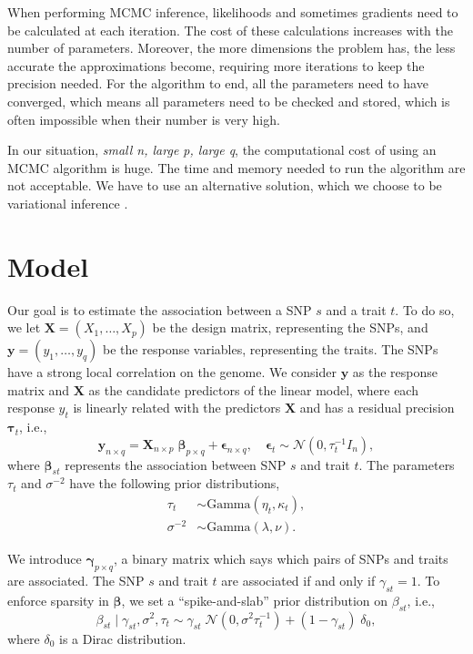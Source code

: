 \documentclass[a4paper, 11pt]{report}
\numberwithin{equation}{chapter}
\begin{document}
When performing MCMC inference, likelihoods and sometimes gradients need to be calculated at each iteration. The cost of these calculations increases with the number of parameters. Moreover, the more dimensions the problem has, the less accurate the approximations become, requiring more iterations to keep the precision needed. For the algorithm to end, all the parameters need to have converged, which means all parameters need to be checked and stored, which is often impossible when their number is very high.

In our situation, \textit{small n, large p, large q}, the computational cost of using an MCMC algorithm is huge. The time and memory needed to run the algorithm are not acceptable. We have to use an alternative solution, which we choose to be variational inference \cite{varInf}. 

\newpage
\chapter{Model}
Our goal is to estimate the association between a SNP $s$ and a trait $t$. To do so, we let $\boldsymbol{X }= (X_1,\ldots,X_p)$ be the design matrix, representing the SNPs, and $\boldsymbol{y} = (y_1,\ldots,y_q)$ be the response variables, representing the traits. The SNPs have a strong local correlation on the genome.  We consider $\boldsymbol{y}$ as the response matrix and $\boldsymbol{X}$ as the candidate predictors of the linear model, where each response $y_t$ is linearly related with the predictors $\boldsymbol{X}$ and has a residual precision $\boldsymbol{\tau}_t$, i.e.,
\begin{equation*}
\label{eq:model}
\boldsymbol{y}_{n\times q} = \boldsymbol{X}_{n \times p}\;\boldsymbol{\beta}_{p \times q}+\boldsymbol{\epsilon}_{n \times q},\quad\boldsymbol{\epsilon}_t \sim \mathcal{N}(0,\tau_t^{-1}I_n),
\end{equation*}
where $\boldsymbol{\beta}_{st}$ represents the association between SNP $s$ and trait $t$. The parameters $\tau_t$ and $\sigma^{-2}$ have the following prior distributions,
\begin{align*}
\tau_t &\sim \text{Gamma}(\eta_t,\kappa_t),\\
\sigma^{-2} &\sim \text{Gamma}(\lambda,\nu).
\end{align*}

We introduce $\boldsymbol{\gamma}_{p\times q}$, a binary matrix which says which pairs of SNPs and traits are associated. The SNP $s$ and trait $t$ are associated if and only if $\gamma_{st} = 1$. To enforce sparsity in $\boldsymbol{\beta}$, we set a ``spike-and-slab'' prior distribution on $\beta_{st}$, i.e.,
\begin{equation*}
\beta_{st} \mid \gamma_{st},\sigma^2, \tau_t \sim \gamma_{st}\;\mathcal{N}(0,\sigma^2\tau_t^{-1})+(1-\gamma_{st})\;\delta_0,
\end{equation*}
where $\delta_0$ is a Dirac distribution.
\end{document}
